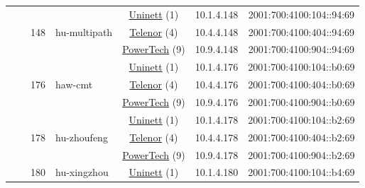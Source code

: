 \begin{small}
\begin{center}
\begin{longtable}{|c|c|c|c|c|c|c|c|}
  &  & \multirow{3}{*}{\tiny{148}} & \multicolumn{1}{|l|}{\multirow{3}{*}{\tiny{hu-multipath}}} & \multicolumn{2}{|c|}{\tiny{\href{https://www.uninett.no}{Uninett} (1)}} & \tiny{10.1.4.148} & \tiny{2001:700:4100:104::94:69} \\* \cline{5-5}\cline{6-6}\cline{7-7}\cline{8-8}
  &  &  &  & \multicolumn{2}{|c|}{\tiny{\href{https://www.telenor.no}{Telenor} (4)}} & \tiny{10.4.4.148} & \tiny{2001:700:4100:404::94:69} \\* \cline{5-5}\cline{6-6}\cline{7-7}\cline{8-8}
  &  &  &  & \multicolumn{2}{|c|}{\tiny{\href{http://www.powertech.no}{PowerTech} (9)}} & \tiny{10.9.4.148} & \tiny{2001:700:4100:904::94:69} \\* \cline{3-3}\cline{4-4}\cline{5-5}\cline{6-6}\cline{7-7}\cline{8-8}
  &  & \multirow{3}{*}{\tiny{176}} & \multicolumn{1}{|l|}{\multirow{3}{*}{\tiny{haw-cmt}}} & \multicolumn{2}{|c|}{\tiny{\href{https://www.uninett.no}{Uninett} (1)}} & \tiny{10.1.4.176} & \tiny{2001:700:4100:104::b0:69} \\* \cline{5-5}\cline{6-6}\cline{7-7}\cline{8-8}
  &  &  &  & \multicolumn{2}{|c|}{\tiny{\href{https://www.telenor.no}{Telenor} (4)}} & \tiny{10.4.4.176} & \tiny{2001:700:4100:404::b0:69} \\* \cline{5-5}\cline{6-6}\cline{7-7}\cline{8-8}
  &  &  &  & \multicolumn{2}{|c|}{\tiny{\href{http://www.powertech.no}{PowerTech} (9)}} & \tiny{10.9.4.176} & \tiny{2001:700:4100:904::b0:69} \\* \cline{3-3}\cline{4-4}\cline{5-5}\cline{6-6}\cline{7-7}\cline{8-8}
  &  & \multirow{3}{*}{\tiny{178}} & \multicolumn{1}{|l|}{\multirow{3}{*}{\tiny{hu-zhoufeng}}} & \multicolumn{2}{|c|}{\tiny{\href{https://www.uninett.no}{Uninett} (1)}} & \tiny{10.1.4.178} & \tiny{2001:700:4100:104::b2:69} \\* \cline{5-5}\cline{6-6}\cline{7-7}\cline{8-8}
  &  &  &  & \multicolumn{2}{|c|}{\tiny{\href{https://www.telenor.no}{Telenor} (4)}} & \tiny{10.4.4.178} & \tiny{2001:700:4100:404::b2:69} \\* \cline{5-5}\cline{6-6}\cline{7-7}\cline{8-8}
  &  &  &  & \multicolumn{2}{|c|}{\tiny{\href{http://www.powertech.no}{PowerTech} (9)}} & \tiny{10.9.4.178} & \tiny{2001:700:4100:904::b2:69} \\* \cline{3-3}\cline{4-4}\cline{5-5}\cline{6-6}\cline{7-7}\cline{8-8}
  &  & \multirow{3}{*}{\tiny{180}} & \multicolumn{1}{|l|}{\multirow{3}{*}{\tiny{hu-xingzhou}}} & \multicolumn{2}{|c|}{\tiny{\href{https://www.uninett.no}{Uninett} (1)}} & \tiny{10.1.4.180} & \tiny{2001:700:4100:104::b4:69} \\* \cline{5-5}\cline{6-6}\cline{7-7}\cline{8-8}

\end{longtable}
\end{center}
\end{small}
